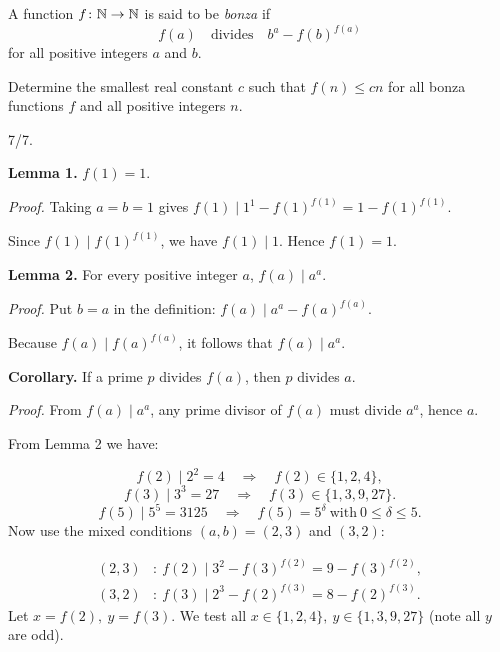 \begin{mdframed}[style=mdpurplebox,frametitle={IMO 2025 Problem 3}]
A function $f \colon \mathbb N \to \mathbb N$ is said to be \emph{bonza} if
\[ f(a)\quad\text{divides}\quad b^a-f(b)^{f(a)} \]
for all positive integers $a$ and $b$.

Determine the smallest real constant $c$ such that $f(n) \leq cn$
for all bonza functions $f$ and all positive integers $n$.
\end{mdframed}

\begin{remark*}
  7/7.
\end{remark*}
\textbf{Lemma 1.} \(f(1)=1\).\par
\emph{Proof.} Taking \(a=b=1\) gives \(f(1)\mid 1^{1}-f(1)^{f(1)}=1-f(1)^{f(1)}\).\par
Since \(f(1)\mid f(1)^{f(1)}\), we have \(f(1)\mid 1\). Hence \(f(1)=1\).\par
\textbf{Lemma 2.} For every positive integer \(a\), \(f(a)\mid a^{a}\).\par
\emph{Proof.} Put \(b=a\) in the definition: \(f(a)\mid a^{a}-f(a)^{f(a)}\).\par
Because \(f(a)\mid f(a)^{f(a)}\), it follows that \(f(a)\mid a^{a}\).\par
\textbf{Corollary.} If a prime \(p\) divides \(f(a)\), then \(p\) divides \(a\).\par
\emph{Proof.} From \(f(a)\mid a^{a}\), any prime divisor of \(f(a)\) must divide \(a^{a}\), hence \(a\).\par
\smallskip
{}
From Lemma 2 we have:\par
\[
f(2)\mid 2^{2}=4\quad\Longrightarrow\quad f(2)\in\{1,2,4\},
\]
\[
f(3)\mid 3^{3}=27\quad\Longrightarrow\quad f(3)\in\{1,3,9,27\}.
\]
\[
f(5)\mid 5^{5}=3125\quad\Longrightarrow\quad f(5)=5^{\delta}\ \text{with}\ 0\le\delta\le 5.
\]
Now use the mixed conditions \((a,b)=(2,3)\) and \((3,2)\):\par
\[
\begin{aligned}
(2,3)&:\ f(2)\mid 3^{2}-f(3)^{f(2)}=9-f(3)^{f(2)},\\
(3,2)&:\ f(3)\mid 2^{3}-f(2)^{f(3)}=8-f(2)^{f(3)}.
\end{aligned}
\]
Let \(x=f(2),\ y=f(3)\). We test all \(x\in\{1,2,4\},\ y\in\{1,3,9,27\}\) (note all \(y\) are odd).\par
{}
